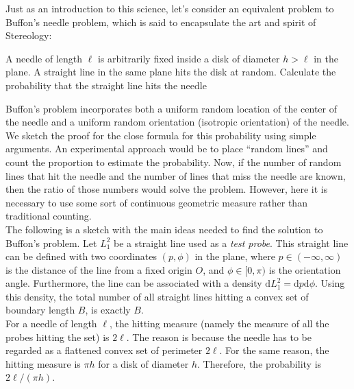 Just as an introduction to this science, let's consider an equivalent problem to Buffon's needle problem, which is said to encapsulate the art and spirit of Stereology:\\
\begin{tcolorbox}
A needle of length $\ell$ is arbitrarily fixed inside a disk of diameter $h > \ell$ in the plane. A straight line in the same plane hits the disk at random. Calculate the probability that the straight line hits the needle\\
\end{tcolorbox}
Buffon's problem incorporates both a uniform random location of the center of the needle and a uniform random orientation (isotropic orientation) of the needle. We sketch the proof for the close formula for this probability using simple arguments. 
An experimental approach would be to place ``random lines'' and count the proportion to estimate the probability.  
Now, if the number of random lines that hit the needle and the number of lines that miss the needle are known, then the ratio of those numbers would solve the problem. However, here it is necessary to use some sort of continuous geometric measure rather than traditional counting.\\

The following is a sketch with the main ideas needed to find the solution to Buffon's problem.
Let $L_1^2$ be a straight line used as a \textit{test probe}. This straight line can be defined with two coordinates $(p,\phi)$ in the plane, where $p \in (-\infty,\infty)$ is the distance of the line from a fixed origin $O$, and $\phi \in [0,\pi)$ is the orientation angle. Furthermore, the line can be associated with a density $\mathrm{d}L_1^2=\mathrm{d}p\mathrm{d}\phi$. Using this density, the total number of all straight lines hitting a convex set of boundary length $B$, is exactly $B$.\\

For a needle of length $\ell$, the hitting measure (namely the measure of all the probes hitting the set) is $2\ell$. The reason is because the needle has to be regarded as a flattened convex set of perimeter $2\ell$. For the same reason, the hitting measure is $\pi h$ for a disk of diameter $h$. Therefore, the probability is $2\ell/(\pi h)$.\\


